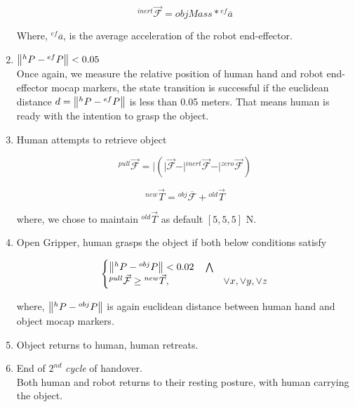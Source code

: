 \begin{enumerate}[start=0,label={\bf{t}\arabic*:}]
    \begin{equation}
        {}^{inert}\vec{\mathcal{F}}  = objMass * {}^{ef}\overline{a}
    \end{equation}

    Where, ${}^{ef}\overline{a}$, is the average acceleration of the robot end-effector.

    \item $\norm{{}^h{P} - {}^{ef}{P}} < 0.05$\\
    Once again, we measure the relative position of human hand and robot end-effector mocap markers, the state transition is successful if the euclidean distance $d = \norm{{}^h{P} - {}^{ef}{P}}$ is less than 0.05 meters. That means human is ready with the intention to grasp the object.
    
    \item Human attempts to retrieve object
    
    \begin{equation}
    {}^{pull}\vec{\mathcal{F}} = \vert{ (\vert{\vec{\mathcal{F}}} - \vert{{}^{inert}\vec{\mathcal{F}}} - \vert{{}^{zero}\vec{\mathcal{F}}}) }
    \end{equation}
    
    \begin{equation}
    {}^{new}\vec{T} = {}^{obj}\overline{\mathcal{F}} + {}^{old}\vec{T}
    \end{equation}
    
    where, we chose to maintain ${}^{old}\vec{T}$ as default $[5, 5, 5]$ N.
    
    \item Open Gripper, human grasps the object if both below conditions satisfy

    \begin{equation}\label{Fpull}
    \begin{cases}
     \norm{{}^h{P} - {}^{obj}{P}} < 0.02 \quad \bigwedge  \\
     {}^{pull}\vec{\mathcal{F}}\geq {}^{new}\vec{T}, & \lor x, \lor y, \lor z
   \end{cases}
   \end{equation}

    where, $\norm{{}^h{P} - {}^{obj}{P}}$ is again euclidean distance between human hand and object mocap markers.

    \item Object returns to human, human retreats.
    
    \item End of $2^{nd}$ \textit{cycle} of handover.\\
    Both human and robot returns to their resting posture, with human carrying the object.
\end{enumerate}
    
